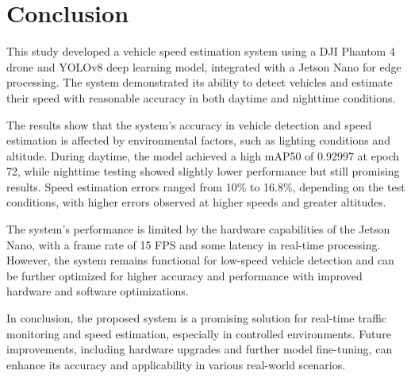 \section{Conclusion}
\label{sec:conclusion}


This study developed a vehicle speed estimation system using a DJI Phantom 4 drone and YOLOv8 deep learning model, integrated with a Jetson Nano for edge processing. The system demonstrated its ability to detect vehicles and estimate their speed with reasonable accuracy in both daytime and nighttime conditions.

The results show that the system's accuracy in vehicle detection and speed estimation is affected by environmental factors, such as lighting conditions and altitude. During daytime, the model achieved a high mAP50 of 0.92997 at epoch 72, while nighttime testing showed slightly lower performance but still promising results. Speed estimation errors ranged from 10\% to 16.8\%, depending on the test conditions, with higher errors observed at higher speeds and greater altitudes.

The system's performance is limited by the hardware capabilities of the Jetson Nano, with a frame rate of 15 FPS and some latency in real-time processing. However, the system remains functional for low-speed vehicle detection and can be further optimized for higher accuracy and performance with improved hardware and software optimizations.

In conclusion, the proposed system is a promising solution for real-time traffic monitoring and speed estimation, especially in controlled environments. Future improvements, including hardware upgrades and further model fine-tuning, can enhance its accuracy and applicability in various real-world scenarios.
